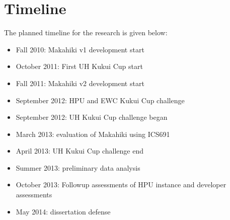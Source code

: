 \section{Timeline}

The planned timeline for the research is given below:

\begin{itemize}
    \item Fall 2010: Makahiki v1 development start
    \item October 2011: First UH Kukui Cup start
	\item Fall 2011: Makahiki v2 development start
	\item September 2012: HPU and EWC Kukui Cup challenge
    \item September 2012: UH Kukui Cup challenge began
	\item March 2013: evaluation of Makahiki using ICS691
    \item April 2013: UH Kukui Cup challenge end
	\item Summer 2013: preliminary data analysis
	\item October 2013: Followup assessments of HPU instance and developer assessments
	\item May 2014: dissertation defense
\end{itemize}
